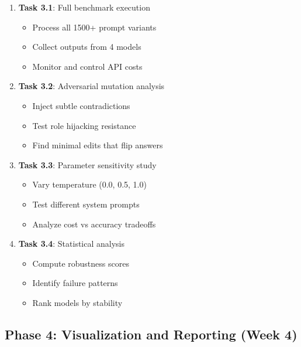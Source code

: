 \documentclass[11pt,a4paper]{article}
\begin{document}
\begin{enumerate}[leftmargin=*]
    \item \textbf{Task 3.1}: Full benchmark execution
    \begin{itemize}
        \item Process all 1500+ prompt variants
        \item Collect outputs from 4 models
        \item Monitor and control API costs
    \end{itemize}
    
    \item \textbf{Task 3.2}: Adversarial mutation analysis
    \begin{itemize}
        \item Inject subtle contradictions
        \item Test role hijacking resistance
        \item Find minimal edits that flip answers
    \end{itemize}
    
    \item \textbf{Task 3.3}: Parameter sensitivity study
    \begin{itemize}
        \item Vary temperature (0.0, 0.5, 1.0)
        \item Test different system prompts
        \item Analyze cost vs accuracy tradeoffs
    \end{itemize}
    
    \item \textbf{Task 3.4}: Statistical analysis
    \begin{itemize}
        \item Compute robustness scores
        \item Identify failure patterns
        \item Rank models by stability
    \end{itemize}
\end{enumerate}

\subsection{Phase 4: Visualization and Reporting (Week 4)}
\end{document}

